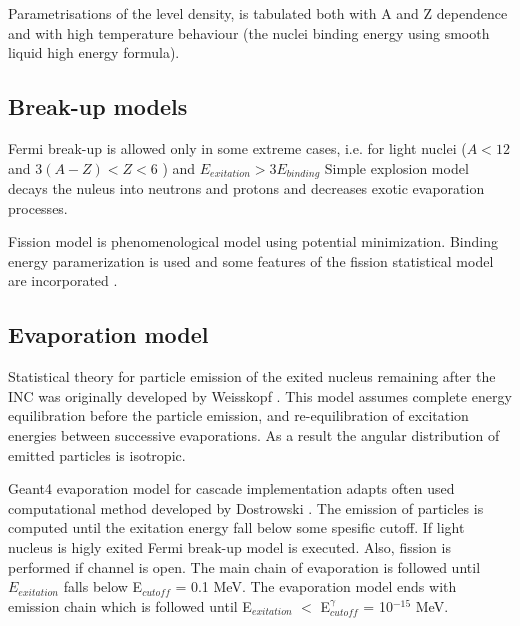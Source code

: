 Parametrisations of the level density, is tabulated both with A and Z dependence and with high temperature 
behaviour (the nuclei binding energy using smooth liquid high energy formula).


\subsection{Break-up models}


Fermi break-up is allowed only in some extreme cases, i.e. for light nuclei ($A < 12$ and  $3 (A - Z) < Z < 6$ ) and $E_{exitation} > 3 E_{binding}$ 
Simple explosion model decays the nuleus into neutrons and protons and decreases exotic evaporation processes.


Fission model is phenomenological model using potential minimization. Binding energy paramerization is used and
some features of the fission statistical model are incorporated \cite{fong69}.

\subsection{Evaporation model}

Statistical theory for particle emission of the exited nucleus remaining after the INC was originally developed by Weisskopf \cite{weisskopf37}. 
This model assumes complete energy equilibration before the particle emission, and re-equilibration of excitation energies between successive evaporations. 
As a result the angular distribution of emitted particles is isotropic.

{\sc Geant4} evaporation model for cascade implementation adapts often used computational method developed by Dostrowski \cite{dostrovsky59, dostrovsky60}.
The emission of particles is computed until the exitation energy fall below some spesific cutoff. 
If light nucleus is higly exited Fermi break-up model is executed. Also, fission is performed if channel is open. 
The main chain of evaporation is followed until  $E_{exitation}$ falls below E$_{cutoff}$ = 0.1 MeV. 
The evaporation model ends with  emission chain which is followed until E$_{exitation}$ $<$ E$^{\gamma}_{cutoff}$ = 10$^{-15}$ MeV.


